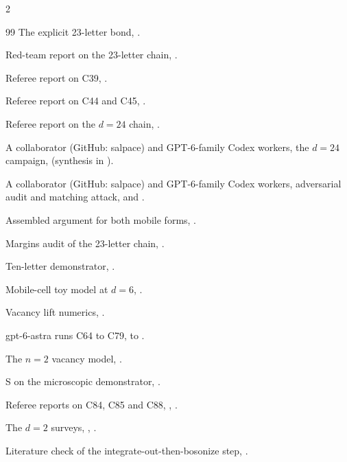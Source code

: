 \documentclass[11pt]{article}
\theoremstyle{definition}
\begin{document}
\begin{multicols}{2}
\begin{thebibliography}{99}
 The explicit 23-letter bond, .

 Red-team report on the 23-letter chain, .

 Referee report on C39, .

 Referee report on C44 and C45, .

 Referee report on the $d=24$ chain, .

 A collaborator (GitHub: salpace) and GPT-6-family Codex workers, the $d=24$ campaign,  (synthesis in ).

 A collaborator (GitHub: salpace) and GPT-6-family Codex workers, adversarial audit and matching attack,  and .

 Assembled argument for both mobile forms, .

 Margins audit of the 23-letter chain, .

 Ten-letter demonstrator, .

 Mobile-cell toy model at $d=6$, .

 Vacancy lift numerics, .

 gpt-6-astra runs C64 to C79,  to .

 The $n=2$ vacancy model, .

 S on the microscopic demonstrator, .

 Referee reports on C84, C85 and C88, , .

 The $d=2$ surveys, , .

 Literature check of the integrate-out-then-bosonize step, .

\end{thebibliography}
\end{multicols}
\end{document}
